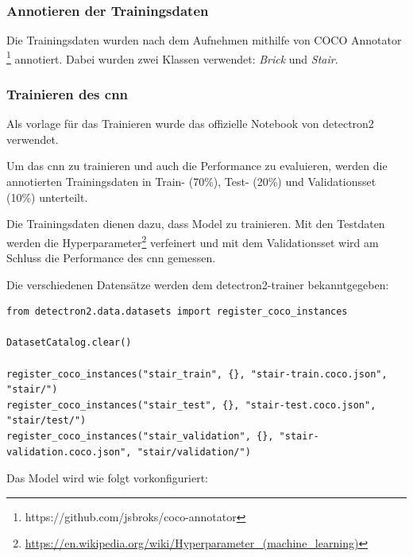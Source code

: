 
\subsubsection{Annotieren der Trainingsdaten}

Die Trainingsdaten wurden nach dem Aufnehmen mithilfe von COCO Annotator \footnote{https://github.com/jsbroks/coco-annotator} annotiert.
Dabei wurden zwei Klassen verwendet: {\it Brick} und {\it Stair}.


\subsubsection{Trainieren des \acrshort{cnn}}

Als vorlage für das Trainieren wurde das offizielle Notebook von detectron2 verwendet. \cite{detectron2-colab}

Um das \acrshort{cnn} zu trainieren und auch die Performance zu evaluieren, werden die annotierten Trainingsdaten
in Train- (70\%), Test- (20\%) und Validationsset (10\%) unterteilt.

Die Trainingsdaten dienen dazu, dass Model zu trainieren. Mit den Testdaten werden die Hyperparameter\footnote{\url{https://en.wikipedia.org/wiki/Hyperparameter_(machine_learning)}} verfeinert und
mit dem Validationsset wird am Schluss die Performance des \acrshort{cnn} gemessen.

Die verschiedenen Datensätze werden dem detectron2-trainer bekanntgegeben:

\begin{verbatim}
from detectron2.data.datasets import register_coco_instances

DatasetCatalog.clear()

register_coco_instances("stair_train", {}, "stair-train.coco.json", "stair/")
register_coco_instances("stair_test", {}, "stair-test.coco.json", "stair/test/")
register_coco_instances("stair_validation", {}, "stair-validation.coco.json", "stair/validation/")
\end{verbatim}

Das Model wird wie folgt vorkonfiguriert:

